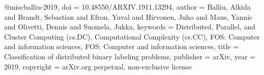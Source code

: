 @misc{balliu-2019,
  doi = {10.48550/ARXIV.1911.13294},
  author = {Balliu,  Alkida and Brandt,  Sebastian and Efron,  Yuval and Hirvonen,  Juho and Maus,  Yannic and Olivetti,  Dennis and Suomela,  Jukka},
  keywords = {Distributed,  Parallel,  and Cluster Computing (cs.DC),  Computational Complexity (cs.CC),  FOS: Computer and information sciences,  FOS: Computer and information sciences},
  title = {Classification of distributed binary labeling problems},
  publisher = {arXiv},
  year = {2019},
  copyright = {arXiv.org perpetual,  non-exclusive license}
}